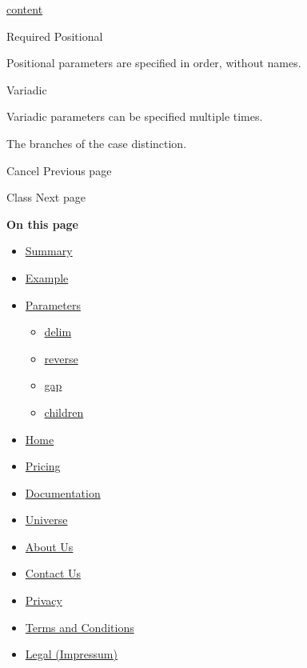 \href{/docs/reference/foundations/content/}{content}

{Required} {{ Positional }}

\label{parameters-children-positional-tooltip}
Positional parameters are specified in order, without names.

{{ Variadic }}

\label{parameters-children-variadic-tooltip}
Variadic parameters can be specified multiple times.

The branches of the case distinction.

\href{/docs/reference/math/cancel/}{\pandocbounded{}}

{ Cancel } { Previous page }

\href{/docs/reference/math/class/}{\pandocbounded{}}

{ Class } { Next page }

\textbf{On this page}

\begin{itemize}
\tightlist
\item
  \hyperref[summary]{Summary}
\item
  \hyperref[example]{Example}
\item
  \hyperref[parameters]{Parameters}

  \begin{itemize}
  \tightlist
  \item
    \hyperref[parameters-delim]{delim}
  \item
    \hyperref[parameters-reverse]{reverse}
  \item
    \hyperref[parameters-gap]{gap}
  \item
    \hyperref[parameters-children]{children}
  \end{itemize}
\end{itemize}

\begin{itemize}
\tightlist
\item
  \href{/}{Home}
\item
  \href{/pricing/}{Pricing}
\item
  \href{/docs/}{Documentation}
\item
  \href{/universe/}{Universe}
\item
  \href{/about/}{About Us}
\item
  \href{/contact/}{Contact Us}
\item
  \href{/privacy/}{Privacy}
\item
  \href{https://typst.app/terms}{Terms and Conditions}
\item
  \href{/legal/}{Legal (Impressum)}
\end{itemize}

